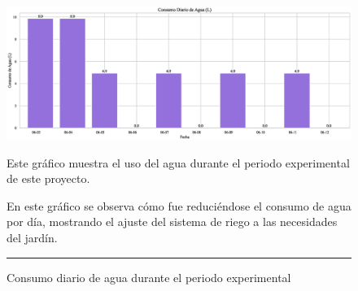 \documentclass[pdflatex,sn-mathphys-num]{sn-jnl}%
\theoremstyle{thmstyleone}%
\theoremstyle{thmstyletwo}%
\theoremstyle{thmstylethree}%
\begin{document}
\begin{figure}[!ht]
    \centering
    \includegraphics[width=1\textwidth]{assets/consumo_diario_barras.eps}

    \caption{Consumo diario de agua durante el periodo experimental}
    \label{fig:consumo}

    \vspace{0.4cm}

    \noindent
    \begin{minipage}[t]{0.48\textwidth}
        \raggedright
        Este gráfico muestra el uso del agua durante el periodo experimental de este proyecto.
    \end{minipage}
    \hfill
    \begin{minipage}[t]{0.48\textwidth}
        \justifying
        En este gráfico se observa cómo fue reduciéndose el consumo de agua por día, mostrando el ajuste del sistema de riego a las necesidades del jardín.
    \end{minipage}

    \vspace{0.5cm}
    \hrule
\end{figure}
\end{document}
